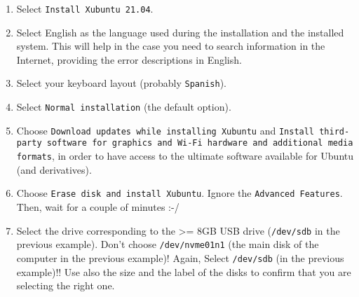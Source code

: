 \begin{enumerate}
\item Select \texttt{Install Xubuntu 21.04}.
  
\item Select English as the language used during the installation and the
  installed system. This will help in the case you need to search
  information in the Internet, providing the error descriptions in
  English.
  
\item Select your keyboard layout (probably \texttt{Spanish}).

%
%

\item Select \verb|Normal installation| (the default option).
  
\item Choose \texttt{Download updates while installing Xubuntu} and
  \texttt{Install third-party software for graphics and Wi-Fi hardware
    and additional media formats}, in order to have access to the
    ultimate software available for Ubuntu (and derivatives).

\item Choose \texttt{Erase disk and install Xubuntu}. Ignore the
  \verb|Advanced Features|. Then, wait for a couple of minutes :-/

\item Select the drive corresponding to the >= 8GB USB drive
  (\texttt{/dev/sdb} in the previous example). Don't choose
  \texttt{/dev/nvme01n1} (the main disk of the computer in the
  previous example)! Again, Select \texttt{/dev/sdb} (in the previous
  example)!! Use also the size and the label of the disks to confirm
  that you are selecting the right one.


\end{enumerate}
